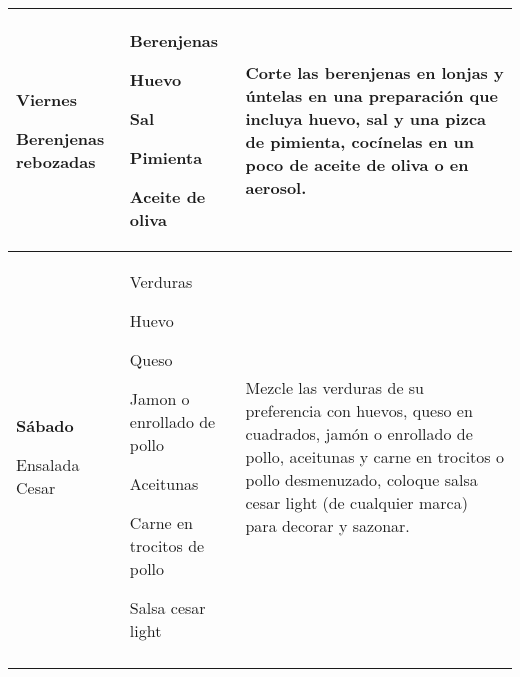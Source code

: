 \documentclass[menu.tex]{subfiles}
\begin{document}
\begin{tabular} {p{3.5cm} p{4cm} p{9cm}}
\pbox{20cm}
{
    \rule{0pt}{3ex}\begin{large}\textbf{Viernes}\end{large}\\
    \rule{0pt}{2ex}Berenjenas rebozadas
} & 
\vspace{-0.3cm}
\begin{compactitem} 
    \begin{footnotesize}
        \item Berenjenas
        \item Huevo
        \item Sal
        \item Pimienta
        \item Aceite de oliva
    \end{footnotesize}
\end{compactitem}&
\vspace{-0.3cm}
Corte las berenjenas en lonjas y úntelas en una preparación que incluya huevo, sal y una pizca de pimienta, cocínelas en un poco de aceite de oliva o en aerosol.\\
\hline

\pbox{20cm}
{
    \rule{0pt}{3ex}\begin{large}\textbf{Sábado}\end{large}\\
    \rule{0pt}{2ex}Ensalada Cesar
}& 
\vspace{-0.3cm}
\begin{compactitem} 
    \begin{footnotesize}
        \item Verduras
        \item Huevo
        \item Queso
        \item Jamon o enrollado de pollo
        \item Aceitunas
        \item Carne en trocitos de pollo
        \item Salsa cesar light
    \end{footnotesize}
\end{compactitem}&
\vspace{-0.3cm}
Mezcle las verduras de su preferencia con huevos, queso en cuadrados, jamón o enrollado de pollo, aceitunas y carne en trocitos o pollo desmenuzado, coloque salsa cesar light (de cualquier marca) para decorar y sazonar.\\ \hline
\newpage
\end{tabular}
\end{document}
